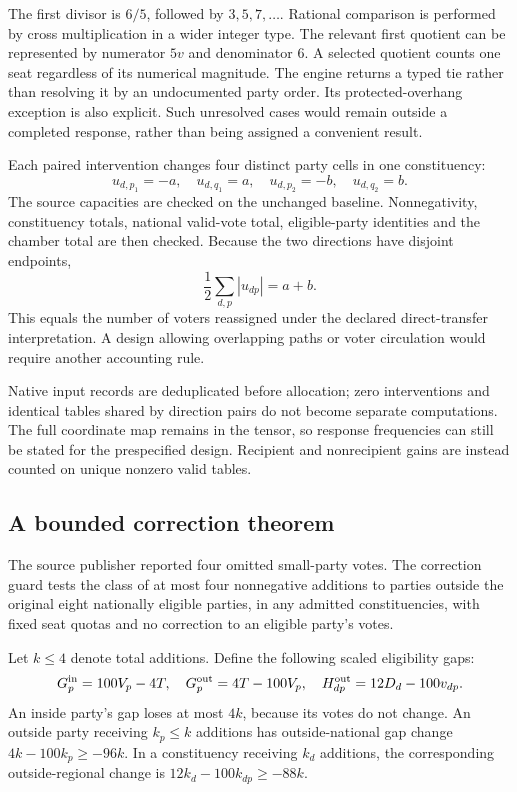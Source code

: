 The first divisor is \(6/5\), followed by \(3,5,7,\ldots\). Rational comparison is performed by cross multiplication in a wider integer type. The relevant first quotient can be represented by numerator \(5v\) and denominator 6. A selected quotient counts one seat regardless of its numerical magnitude. The engine returns a typed tie rather than resolving it by an undocumented party order. Its protected-overhang exception is also explicit. Such unresolved cases would remain outside a completed response, rather than being assigned a convenient result.

Each paired intervention changes four distinct party cells in one constituency:
\[
u_{d,p_1}=-a,\quad u_{d,q_1}=a,\quad
u_{d,p_2}=-b,\quad u_{d,q_2}=b.
\]
The source capacities are checked on the unchanged baseline. Nonnegativity, constituency totals, national valid-vote total, eligible-party identities and the chamber total are then checked. Because the two directions have disjoint endpoints,
\[
\frac12\sum_{d,p}|u_{dp}|=a+b.
\]
This equals the number of voters reassigned under the declared direct-transfer interpretation. A design allowing overlapping paths or voter circulation would require another accounting rule.

Native input records are deduplicated before allocation; zero interventions and identical tables shared by direction pairs do not become separate computations. The full coordinate map remains in the tensor, so response frequencies can still be stated for the prespecified design. Recipient and nonrecipient gains are instead counted on unique nonzero valid tables.

\subsection{A bounded correction theorem}

The source publisher reported four omitted small-party votes. The correction guard tests the class of at most four nonnegative additions to parties outside the original eight nationally eligible parties, in any admitted constituencies, with fixed seat quotas and no correction to an eligible party's votes.

Let \(k\le4\) denote total additions. Define the following scaled eligibility gaps:
\[
G^{\rm in}_p=100V_p-4T,\quad
G^{\rm out}_p=4T-100V_p,\quad
H^{\rm out}_{dp}=12D_d-100v_{dp}.
\]
An inside party's gap loses at most \(4k\), because its votes do not change. An outside party receiving \(k_p\le k\) additions has outside-national gap change \(4k-100k_p\ge-96k\). In a constituency receiving \(k_d\) additions, the corresponding outside-regional change is \(12k_d-100k_{dp}\ge-88k\).

